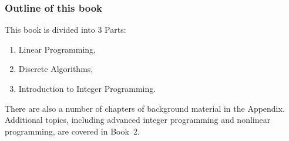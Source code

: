 \subsubsection*{Outline of this book}
This book is divided into 3 Parts:

\begin{enumerate}
\item[Part I] Linear Programming,
\item[Part II] Discrete Algorithms,
\item[Part III] Introduction to Integer Programming.
\end{enumerate}
There are also a number of chapters of background material in the Appendix.  Additional topics, including advanced integer programming and nonlinear programming, are covered in Book~2.

